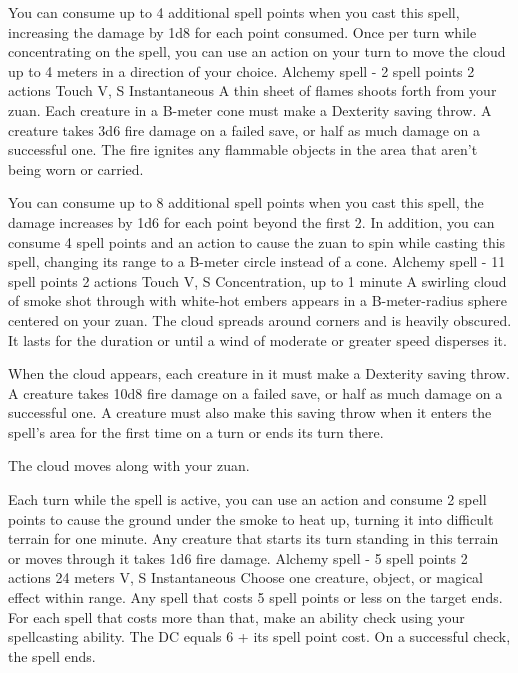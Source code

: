         You can consume up to 4 additional spell points when you cast this spell, increasing the damage by 1d8 for each point consumed.
        Once per turn while concentrating on the spell, you can use an action on your turn to move the cloud up to 4 meters in a direction of your choice.
        {Alchemy spell - 2 spell points}
        {2 actions}
        {Touch}
        {V, S}
        {Instantaneous}
        A thin sheet of flames shoots forth from your zuan.
        Each creature in a B-meter cone must make a Dexterity saving throw.
        A creature takes 3d6 fire damage on a failed save, or half as much damage on a successful one.
        The fire ignites any flammable objects in the area that aren't being worn or carried.

        You can consume up to 8 additional spell points when you cast this spell, the damage increases by 1d6 for each point beyond the first 2.
        In addition, you can consume 4 spell points and an action to cause the zuan to spin while casting this spell, changing its range to a B-meter circle instead of a cone.
        {Alchemy spell - 11 spell points}
        {2 actions}
        {Touch}
        {V, S}
        {Concentration, up to 1 minute}
        A swirling cloud of smoke shot through with white-hot embers appears in a B-meter-radius sphere centered on your zuan.
        The cloud spreads around corners and is heavily obscured.
        It lasts for the duration or until a wind of moderate or greater speed disperses it.

        When the cloud appears, each creature in it must make a Dexterity saving throw.
        A creature takes 10d8 fire damage on a failed save, or half as much damage on a successful one.
        A creature must also make this saving throw when it enters the spell's area for the first time on a turn or ends its turn there.

        The cloud moves along with your zuan.

        Each turn while the spell is active, you can use an action and consume 2 spell points to cause the ground under the smoke to heat up, turning it into difficult terrain for one minute.
        Any creature that starts its turn standing in this terrain or moves through it takes 1d6 fire damage.
        {Alchemy spell - 5 spell points}
        {2 actions}
        {24 meters}
        {V, S}
        {Instantaneous}
        Choose one creature, object, or magical effect within range.
        Any spell that costs 5 spell points or less on the target ends.
        For each spell that costs more than that, make an ability check using your spellcasting ability.
        The DC equals 6 + its spell point cost.
        On a successful check, the spell ends.

